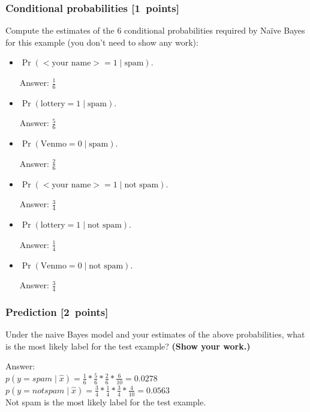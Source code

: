 \documentclass{article}
\newcommand{\blu}[1]{{\textcolor{blu}{#1}}}
\newenvironment{answer}{\par\begingroup\color{gre}Answer: }{\endgroup}
\let\ask\blu
\newcommand\pts[1]{\textcolor{pointscolour}{[#1~points]}}
\begin{document}
    \subsubsection{Conditional probabilities \pts{1}}

    \ask{Compute the estimates of the 6 conditional probabilities required by Na\"ive Bayes for this example}  (you don't need to show any work):
    \begin{itemize}
        \item $\Pr(\text{$<$your name$>$} = 1  \mid \text{spam})$.
        \begin{answer}
            $\frac{1}{6}$
        \end{answer}
        \item $\Pr(\text{lottery} = 1 \mid \text{spam})$.
        \begin{answer}
            $\frac{5}{6}$
        \end{answer}
        \item $\Pr(\text{Venmo} = 0  \mid \text{spam})$.
        \begin{answer}
            $\frac{2}{6}$
        \end{answer}
        \item $\Pr(\text{$<$your name$>$} = 1  \mid \text{not spam})$.
        \begin{answer}
            $\frac{3}{4}$
        \end{answer}
        \item $\Pr(\text{lottery} = 1  \mid \text{not spam})$.
        \begin{answer}
            $\frac{1}{4}$
        \end{answer}
        \item $\Pr(\text{Venmo} = 0  \mid \text{not spam})$.
        \begin{answer}
            $\frac{3}{4}$
        \end{answer}
    \end{itemize}

    \subsubsection{Prediction \pts{2}}

    \ask{Under the naive Bayes model and your estimates of the above probabilities, what is the most likely label for the test example? \textbf{(Show your work.)}}
    
    \begin{answer} \\
            $p(y = spam \mid \hat{x}) = \frac{1}{6} * \frac{5}{6} * \frac{2}{6} * \frac{6}{10} = 0.0278$ \\
            $p(y = not spam \mid \hat{x}) = \frac{3}{4} * \frac{1}{4} * \frac{3}{4} * \frac{4}{10} = 0.0563$ \\
            Not spam is the most likely label for the test example.
    \end{answer}
\end{document}
